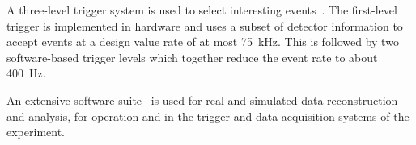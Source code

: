 A three-level trigger system is used to select interesting events~\cite{PERF-2011-02}.
The first-level trigger is implemented in hardware and uses a subset of detector information
to accept events at a design value rate of at most \SI{75}{\kHz}.
This is followed by two software-based trigger levels which together reduce the event rate to about \SI{400}{\Hz}.

An extensive software suite~\cite{ATL-SOFT-PUB-2021-001} is used for real and simulated data reconstruction
and analysis, for operation and in the trigger and data acquisition systems of the experiment.

